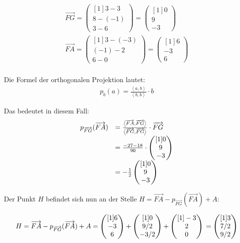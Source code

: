 \documentclass[main.tex]{subfiles}
\begin{document}
\begin{gather*}
    \overrightarrow{FG} =\begin{pmatrix}[1]
    3-3\\
    8-(-1)\\
    3-6
    \end{pmatrix} =\begin{pmatrix}[1]
    0\\
    9\\
    -3
    \end{pmatrix}\\
    \overrightarrow{FA} =\begin{pmatrix}[1]
    3-( -3)\\
    ( -1) -2\\
    6-0
    \end{pmatrix} =\begin{pmatrix}[1]
    6\\
    -3\\
    6
    \end{pmatrix}\\
\end{gather*}

Die Formel der orthogonalen Projektion lautet:
\begin{gather*}
    p_{b}(a) = \frac{ \left\langle a,b \right\rangle }{ \left\langle b,b \right\rangle } \cdotp b
\end{gather*}

Das bedeutet in diesem Fall:
\begin{equation*}
	\begin{array}{ r l }
	p_{\vec{FG}}(\vec{FA}) & =\frac{\left\langle \vec{FA},\vec{FG} \right\rangle}{\left\langle \vec{FG},\vec{FG} \right\rangle} \cdotp \vec{FG} \\
		& = \frac{-27-18}{90} \cdotp \begin{pmatrix}[1]
			0 \\ 9 \\ -3 \end{pmatrix}\\
		& = -\frac{1}{2} \begin{pmatrix}[1]
			0 \\ 9 \\ -3 \end{pmatrix}
	\end{array}
\end{equation*}

Der Punkt $H$ befindet sich nun an der Stelle $H = \vec{FA} - p_{\vec{FG}}(\vec{FA}) + A$:

	$$
		H = \vec{FA} - p_{\vec{FG}}(\vec{FA}) + A \\
		= \begin{pmatrix}[1] 6 \\ -3 \\ 6 \end{pmatrix}
		+ \begin{pmatrix}[1] 0 \\ 9/2 \\ -3/2 \end{pmatrix}
		+ \begin{pmatrix}[1] -3 \\ 2 \\ 0 \end{pmatrix}\\
		= \begin{pmatrix}[1] 3 \\ 7/2 \\ 9/2 \end{pmatrix}
	$$
\end{document}
